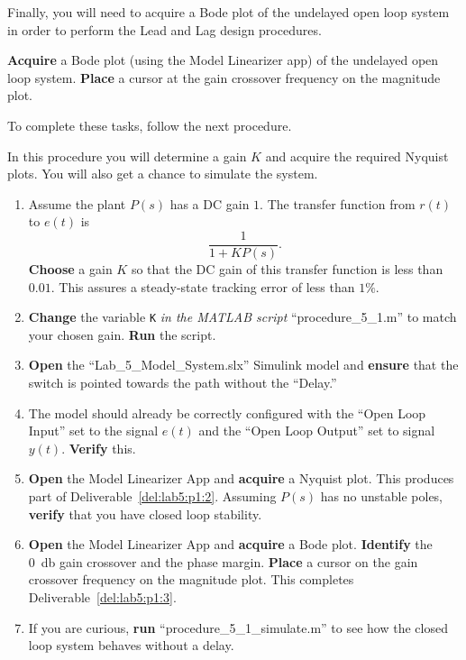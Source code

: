 %
Finally, you will need to acquire a Bode plot of the undelayed open loop system in order to perform the Lead and Lag design procedures.
%
\begin{deliverable}[label={del:lab5:p1:3}]
  \textbf{Acquire} a Bode plot (using the Model Linearizer app) of the undelayed open loop system.
  \textbf{Place} a cursor at the gain crossover frequency on the magnitude plot.
\end{deliverable}
%
To complete these tasks, follow the next procedure.
%
\begin{procedure}[label={proc:lab5:1}]
  In this procedure you will determine a gain \(K\) and acquire the required Nyquist plots.
  You will also get a chance to simulate the system.
  \begin{enumerate}[label={(\arabic*)}]
    \item{%
      Assume the plant \(P(s)\) has a DC gain \(1.\)
      The transfer function from \(r(t)\) to \(e(t)\) is
      \[
        \frac{1}{1 + K P(s)}.
      \]
      \textbf{Choose} a gain \(K\) so that the DC gain of this transfer function is less than \(0.01.\)
      This assures a steady-state tracking error of less than \(1\%.\)
    }
    \item{%
      \textbf{Change} the variable \texttt{K} \emph{in the MATLAB script} ``procedure\_5\_1.m'' to match your chosen gain.
      \textbf{Run} the script.
    }
    \item{%
      \textbf{Open} the ``Lab\_5\_Model\_System.slx'' Simulink model and \textbf{ensure} that the switch is pointed towards the path without the ``Delay.''
    }
    \item{%
      The model should already be correctly configured with the ``Open Loop Input'' set to the signal \(e(t)\) and the ``Open Loop Output'' set to signal \(y(t).\)
      \textbf{Verify} this.
    }
    \item{%
      \textbf{Open} the Model Linearizer App and \textbf{acquire} a Nyquist plot.
      This produces part of Deliverable~\ref{del:lab5:p1:2}.
      Assuming \(P(s)\) has no unstable poles, \textbf{verify} that you have closed loop stability.
    }
    \item{%
      \textbf{Open} the Model Linearizer App and \textbf{acquire} a Bode plot.
      \textbf{Identify} the \SI{0}{\decibel} gain crossover and the phase margin.
      \textbf{Place} a cursor on the gain crossover frequency on the magnitude plot.
      This completes Deliverable~\ref{del:lab5:p1:3}.
    }
    \item{%
      If you are curious, \textbf{run} ``procedure\_5\_1\_simulate.m'' to see how the closed loop system behaves without a delay.
}
\end{enumerate}
\end{procedure}
